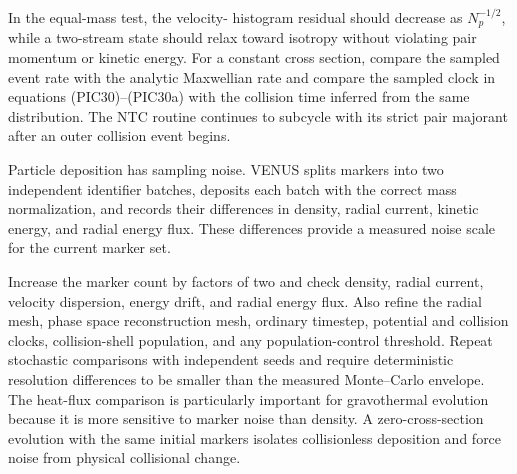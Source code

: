 In the equal-mass test, the velocity-
histogram residual should decrease as \(N_p^{-1/2}\), while a two-stream state
should relax toward isotropy without violating pair momentum or kinetic
energy.  For a constant cross section, compare the sampled event rate with
the analytic Maxwellian rate and compare the sampled clock in equations
(PIC30)--(PIC30a) with the collision time inferred from the same distribution.
The NTC routine continues to subcycle with its strict pair majorant after an
outer collision event begins.

Particle deposition has sampling noise.  VENUS splits markers into two
independent identifier batches, deposits each batch with the correct mass
normalization, and records their differences in density, radial current,
kinetic energy, and radial energy flux.  These differences provide a measured
noise scale for the current marker set.

Increase the marker count by factors of two and
check density, radial current, velocity dispersion, energy drift, and radial
energy flux.  Also refine the radial mesh, phase space reconstruction mesh,
ordinary timestep, potential and collision clocks, collision-shell
population, and any population-control threshold.  Repeat stochastic
comparisons with independent seeds and require deterministic resolution
differences to be smaller than the measured Monte--Carlo envelope.  The
heat-flux comparison is particularly important for gravothermal evolution
because it is more sensitive to marker noise than density.  A
zero-cross-section evolution with the same initial markers isolates
collisionless deposition and force noise from physical collisional change.
